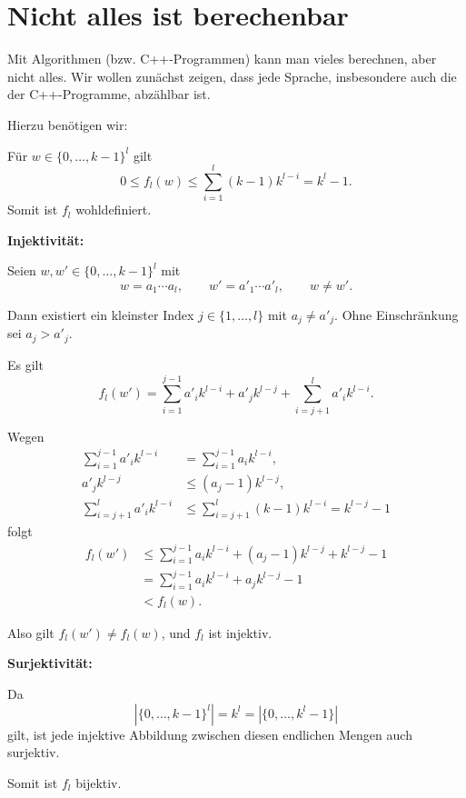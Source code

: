 
\section{Nicht alles ist berechenbar}

Mit Algorithmen (bzw. C++-Programmen) kann man vieles berechnen,
aber nicht alles. Wir wollen zunächst zeigen, dass jede Sprache,
insbesondere auch die der C++-Programme, abzählbar ist.

Hierzu benötigen wir:


\begin{myproof}
  Für $w\in\{0,\dots,k-1\}^l$ gilt
  \[
    0\le f_l(w)
    \le\sum_{i=1}^l(k-1)k^{l-i}
    =k^l-1.
  \]
  Somit ist $f_l$ wohldefiniert.

  \medskip
  \textbf{Injektivität:}

  Seien $w,w'\in\{0,\dots,k-1\}^l$ mit
  \[
    w=a_1\cdots a_l,\qquad
    w'=a'_1\cdots a'_l,\qquad w\ne w'.
  \]

  Dann existiert ein kleinster Index $j\in\{1,\dots,l\}$
  mit $a_j\ne a'_j$. Ohne Einschränkung sei $a_j>a'_j$.

  Es gilt
  \[
    f_l(w')
    =\sum_{i=1}^{j-1}a'_i k^{l-i}
    +a'_j k^{l-j}
    +\sum_{i=j+1}^l a'_i k^{l-i}.
  \]

  Wegen
  \begin{align*}
    \sum_{i=1}^{j-1}a'_i k^{l-i}
    &=\sum_{i=1}^{j-1}a_i k^{l-i},\\
    a'_j k^{l-j}
    &\le(a_j-1)k^{l-j},\\
    \sum_{i=j+1}^l a'_i k^{l-i}
    &\le\sum_{i=j+1}^l(k-1)k^{l-i}
     =k^{l-j}-1
  \end{align*}
  folgt
  \begin{align*}
    f_l(w')
    &\le\sum_{i=1}^{j-1}a_i k^{l-i}
      +(a_j-1)k^{l-j}+k^{l-j}-1\\
    &=\sum_{i=1}^{j-1}a_i k^{l-i}
      +a_j k^{l-j}-1\\
    &<f_l(w).
  \end{align*}

  Also gilt $f_l(w')\ne f_l(w)$, und $f_l$ ist injektiv.

  \medskip
  \textbf{Surjektivität:}

  Da
  \[
    |\{0,\dots,k-1\}^l|
    =k^l
    =|\{0,\dots,k^l-1\}|
  \]
  gilt, ist jede injektive Abbildung zwischen diesen
  endlichen Mengen auch surjektiv.

  Somit ist $f_l$ bijektiv.
\end{myproof}


